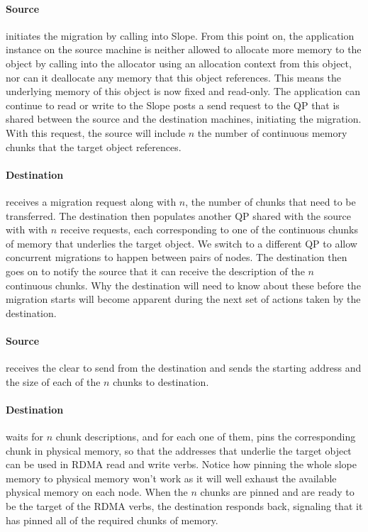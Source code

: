 \paragraph{Source}
initiates the migration by calling into Slope. From this point
on, the application instance on the source machine is neither allowed to
allocate more memory to the object by calling into the allocator using
an allocation context from this object, nor can it deallocate any memory that
this object references. This means the underlying memory of this object is now
fixed and read-only. The application can continue to read or write to the
Slope posts a send request to the QP that is shared
between the source and the destination machines, initiating the migration.
With this request, the source will include $n$ the number of continuous memory
chunks that the target object references.

\paragraph{Destination}
receives a migration request along with $n$, the number of chunks that need to
be transferred. The destination then populates another QP shared with the source
with with $n$ receive requests, each corresponding to one of the continuous
chunks of memory that underlies the target object. We switch to a different QP
to allow concurrent migrations to happen between pairs of nodes. The destination
then goes on to notify the source that it can receive the description of the $n$
continuous chunks. Why the destination will need to know about these before the
migration starts will become apparent during the next set of actions taken by
the destination.

\paragraph{Source}
receives the clear to send from the destination and sends the starting address
and the size of each of the $n$ chunks to destination.

\paragraph{Destination}
waits for $n$ chunk descriptions, and for each one of them, pins the
corresponding chunk in physical memory, so that the addresses that underlie the
target object can be used in RDMA read and write verbs. Notice how pinning the
whole slope memory to physical memory won't work as it will well exhaust the
available physical memory on each node. When the $n$ chunks are pinned
and are ready to be the target of the RDMA verbs, the destination responds back,
signaling that it has pinned all of the required chunks of memory.

